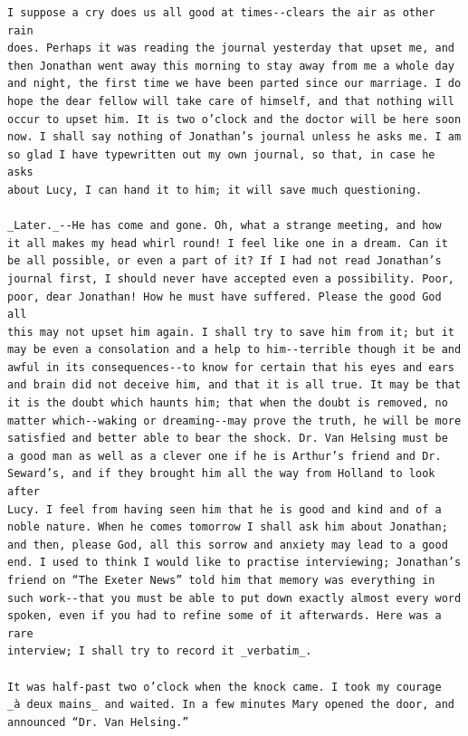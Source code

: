 \documentclass{article}
\begin{document}
\begin{verbatim}
I suppose a cry does us all good at times--clears the air as other rain
does. Perhaps it was reading the journal yesterday that upset me, and
then Jonathan went away this morning to stay away from me a whole day
and night, the first time we have been parted since our marriage. I do
hope the dear fellow will take care of himself, and that nothing will
occur to upset him. It is two o’clock and the doctor will be here soon
now. I shall say nothing of Jonathan’s journal unless he asks me. I am
so glad I have typewritten out my own journal, so that, in case he asks
about Lucy, I can hand it to him; it will save much questioning.

_Later._--He has come and gone. Oh, what a strange meeting, and how
it all makes my head whirl round! I feel like one in a dream. Can it
be all possible, or even a part of it? If I had not read Jonathan’s
journal first, I should never have accepted even a possibility. Poor,
poor, dear Jonathan! How he must have suffered. Please the good God all
this may not upset him again. I shall try to save him from it; but it
may be even a consolation and a help to him--terrible though it be and
awful in its consequences--to know for certain that his eyes and ears
and brain did not deceive him, and that it is all true. It may be that
it is the doubt which haunts him; that when the doubt is removed, no
matter which--waking or dreaming--may prove the truth, he will be more
satisfied and better able to bear the shock. Dr. Van Helsing must be
a good man as well as a clever one if he is Arthur’s friend and Dr.
Seward’s, and if they brought him all the way from Holland to look after
Lucy. I feel from having seen him that he is good and kind and of a
noble nature. When he comes tomorrow I shall ask him about Jonathan;
and then, please God, all this sorrow and anxiety may lead to a good
end. I used to think I would like to practise interviewing; Jonathan’s
friend on “The Exeter News” told him that memory was everything in
such work--that you must be able to put down exactly almost every word
spoken, even if you had to refine some of it afterwards. Here was a rare
interview; I shall try to record it _verbatim_.

It was half-past two o’clock when the knock came. I took my courage
_à deux mains_ and waited. In a few minutes Mary opened the door, and
announced “Dr. Van Helsing.”


\end{verbatim}
\end{document}
